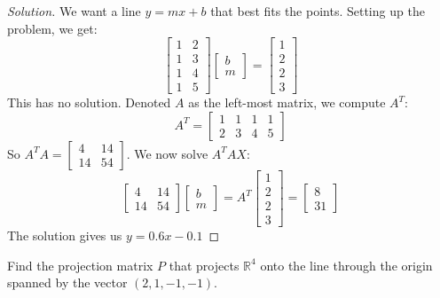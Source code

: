 \documentclass[../main.tex]{subfiles}
\begin{document}
\begin{proof}[Solution]
We want a line $y=mx+b$ that best fits the points. Setting up the problem, we get:
%
\begin{equation*}
    \begin{bmatrix} 1 & 2 \\ 1 & 3 \\ 1 & 4 \\ 1 & 5 \end{bmatrix} \begin{bmatrix} b \\ m \end{bmatrix} = \begin{bmatrix} 1 \\ 2 \\ 2 \\ 3\end{bmatrix}   
\end{equation*}
%
This has no solution. Denoted $A$ as the left-most matrix, we compute $A^T$:
%
\begin{equation*}
    A^T = \begin{bmatrix} 1 & 1 & 1 & 1 \\ 2 & 3 & 4 & 5 \end{bmatrix}   
\end{equation*}
%
So $A^T A = \begin{bmatrix} 4 & 14 \\ 14 & 54 \end{bmatrix}$. We now solve $A^{T}AX$:
%
\begin{equation*}
    \begin{bmatrix} 4 & 14 \\ 14 & 54 \end{bmatrix} \begin{bmatrix} b \\ m \end{bmatrix} =  A^T \begin{bmatrix} 1 \\ 2 \\ 2 \\ 3 \end{bmatrix} = \begin{bmatrix} 8 \\ 31 \end{bmatrix}   
\end{equation*}
%
The solution gives us $y = 0.6x-0.1$
\end{proof}
%
\begin{problem}
Find the projection matrix $P$ that projects $\mathbb{R}^4$ onto the line through the origin spanned by the vector $(2,1,-1,-1)$.
\end{problem}
\end{document}
